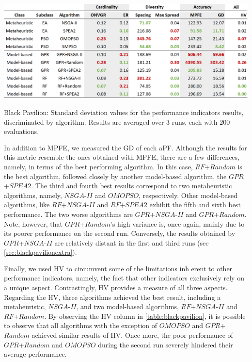 \begin{table}[htbp]
	\centering
	\includegraphics[width=\textwidth]{Images/Evaluation/BlackPavilion/Results_Std_20190428.PNG}
	\caption[Black Pavilion: Standard deviation values for the performance indicators results, discriminated by algorithm]{Black Pavilion: Standard deviation values for the performance indicators results, discriminated by algorithm. Results are averaged over $3$ runs, each with $200$ evaluations.}
	\label{table:blackpavilionstd}
\end{table}

In addition to \ac{MPFE}, we measured the \ac{GD} of each \ac{aPF}. Although the results for this metric resemble the ones obtained with \ac{MPFE}, there are a few differences, namely, in terms of the best performing algorithm. In this case, $RF$+$Random$ is the best algorithm, followed closely by another model-based algorithm, the $GPR$+$SPEA2$. The third and fourth best results correspond to two metaheuristic algorithms, namely, $NSGA$-$II$ and $OMOPSO$, respectively. Other model-based algorithms, like $RF$+$NSGA$-$II$ and $RF$+$SPEA2$ exhibit the fifth and sixth best performance. The two worse algorithms are $GPR$+$NSGA$-$II$ and $GPR$+$Random$. Note, however, that $GPR$+$Random$'s high variance is, once again, mainly due to its poorer performance on the second run. Conversely, the results obtained by $GPR$+$NSGA$-$II$ are relatively distant in the first and third runs (see \cref{sec:blackpavilionextra}).

Finally, we used \ac{HV} to circumvent some of the limitations inh	erent to other performance indicators, namely, the fact that other indicators exclusively rely on a unique aspect. Contrastingly, \ac{HV} provides a measure of all three aspects. Regarding the \ac{HV}, three algorithms achieved the best result, including a metaheuristic, $NSGA$-$II$, and two model-based algorithms, $RF$+$NSGA$-$II$ and $RF$+$Random$. By observing the \ac{HV} column in \cref{table:blackpavilion}, it is possible to observe that all algorithms with the exception of $OMOPSO$ and $GPR$+$Random$ achieved similar results of \ac{HV}. Once more, the poor performance of $GPR$+$Random$ and $OMOPSO$ during the second run severely hindered their average performance.

